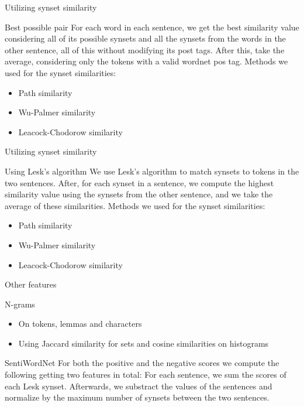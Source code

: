 \documentclass[usenames,dvipsnames]{beamer}
\begin{document}
\begin{frame}{Utilizing synset similarity}
    \begin{block}{Best possible pair}
        For each word in each sentence, we get the best similarity value considering all of its possible synsets and all the synsets from the words in the other sentence, all of this without modifying its post tags. After this, take the average, considering only the tokens with a valid wordnet pos tag.
        Methods we used for the synset similarities: 
        \begin{itemize}
            \item Path similarity
            \item Wu-Palmer similarity
            \item Leacock-Chodorow similarity
        \end{itemize}
    \end{block}
     
\end{frame}
\begin{frame}{Utilizing synset similarity}
    \begin{block}{Using Lesk's algorithm}
        We use Lesk's algorithm to match synsets to tokens in the two sentences.
        After, for each synset in a sentence, we compute the highest similarity value using the synsets from the other sentence, and we take the average of these similarities.
        Methods we used for the synset similarities: 
        \begin{itemize}
            \item Path similarity
            \item Wu-Palmer similarity
            \item Leacock-Chodorow similarity
        \end{itemize}
    \end{block}
\end{frame}

\begin{frame}{Other features}
    \begin{block}{N-grams}
        \begin{itemize}
            \item On tokens, lemmas and characters
            \item Using Jaccard similarity for sets and cosine similarities on histograms
        \end{itemize}
    \end{block}
    \begin{block}{SentiWordNet}
        For both the positive and the negative scores we compute the following getting two features in total:
        For each sentence, we sum the scores of each Lesk synset. Afterwards, we substract the values of the sentences and normalize by the maximum number of synsets between the two sentences.
    \end{block}
\end{frame}
\end{document}
